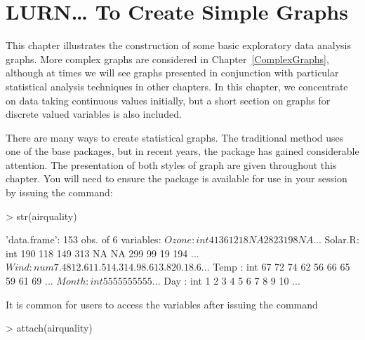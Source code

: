 



\chapter{LURN\ldots{} To Create Simple Graphs} 
\label{SimpleGraphs} 
 
 
 




This chapter illustrates the construction of some basic exploratory data analysis graphs. More complex graphs are considered in Chapter~\ref{ComplexGraphs}, although at times we will see graphs presented in conjunction with particular statistical analysis techniques in other chapters. In this chapter, we concentrate on data taking continuous values initially, but a short section on graphs for discrete valued variables is also included. 

There are many ways to create statistical graphs. The traditional method uses one of the base \R{} packages, but in recent years, the  package has gained considerable attention. The presentation of both styles of graph are given throughout this chapter. You will need to ensure the  package is available for use in your \R{} session by issuing the command:

\begin{Schunk}
\begin{Sinput}
> str(airquality) 
\end{Sinput}
\begin{Soutput}
'data.frame':	153 obs. of  6 variables:
 $ Ozone  : int  41 36 12 18 NA 28 23 19 8 NA ...
 $ Solar.R: int  190 118 149 313 NA NA 299 99 19 194 ...
 $ Wind   : num  7.4 8 12.6 11.5 14.3 14.9 8.6 13.8 20.1 8.6 ...
 $ Temp   : int  67 72 74 62 56 66 65 59 61 69 ...
 $ Month  : int  5 5 5 5 5 5 5 5 5 5 ...
 $ Day    : int  1 2 3 4 5 6 7 8 9 10 ...
\end{Soutput}
\end{Schunk}

It is common for \R{} users to access the variables after issuing the command 

\begin{Schunk}
\begin{Sinput}
> attach(airquality) 
\end{Sinput}
\end{Schunk}

